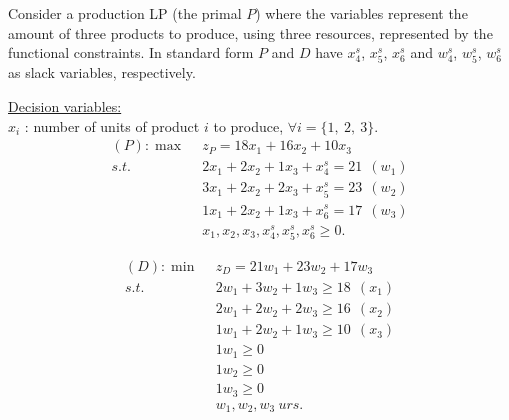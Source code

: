







 Consider a production LP (the primal $P$) where the variables represent the amount of three products to produce, using three resources, represented by the functional constraints.   In standard form $P$ and $D$ have $x^s_4$, $x^s_5$, $x^s_6$ and $w^s_4$, $w^s_5$, $w^s_6$ as slack variables, respectively. %

\vspace{3mm}\underline{Decision variables:} \\
$x_i$ : number of units of product $i$ to produce, $\forall i = \{1,~2,~3\}$.
\begin{align*}
(P): \max~~  & z_P = 18x_1 + 16x_2 + 10x_3 \\
{s.t.}~~& 2x_1 + 2x_2 + 1x_3  +x^{s}_4 = 21~~ (w_1) \\
& 3x_1 + 2x_2 + 2x_3 + x^{s}_5 = 23~~ (w_2)  \\
&  1x_1 + 2x_2 + 1x_3  + x^{s}_6 = 17~~ (w_3) \\
& x_1, x_2, x_3, x^{s}_4, x^{s}_5, x^{s}_6 \ge 0.
\end{align*} 

\begin{align*}
(D): \min~~ & z_D =21w_1 +23w_2 +17w_3  \\
{s.t.}~~ & 2w_1 +3w_2 + 1w_3 \ge 18 ~~ (x_1) \\
& 2w_1 +2w_2 + 2w_3 \ge 16 ~~ (x_2)\\
& 1w_1 +2w_2 + 1w_3 \ge 10 ~~ (x_3)\\
& 1w_1 \ge 0 \\
& 1w_2 \ge 0 \\
& 1w_3 \ge 0 \\
& w_1, w_2, w_3~urs.
\end{align*}

